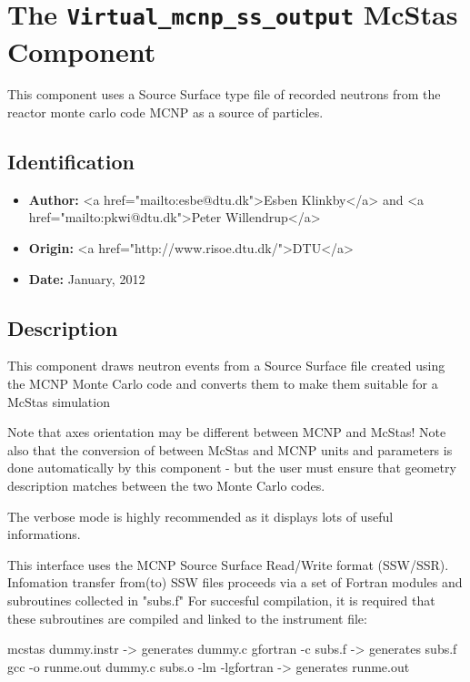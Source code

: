 \section{The \texttt{Virtual\_mcnp\_ss\_output} McStas Component}
This component uses a Source Surface type file of recorded neutrons from the
reactor monte carlo code MCNP as a source of particles.

\subsection*{Identification}
\begin{itemize}
  \item \textbf{Author:} \textless{}a href="mailto:esbe@dtu.dk"\textgreater{}Esben Klinkby\textless{}/a\textgreater{} and \textless{}a href="mailto:pkwi@dtu.dk"\textgreater{}Peter Willendrup\textless{}/a\textgreater{}
  \item \textbf{Origin:} \textless{}a href="http://www.risoe.dtu.dk/"\textgreater{}DTU\textless{}/a\textgreater{}
  \item \textbf{Date:} January, 2012
\end{itemize}

\subsection*{Description}
This component draws neutron events from a Source Surface file created using the MCNP Monte Carlo code and converts them to make them suitable for a McStas simulation

Note that axes orientation may be different between MCNP and McStas! Note also that the conversion of between McStas and MCNP units and parameters is done automatically by this component - but the user must ensure that geometry description matches between the two Monte Carlo codes.

The verbose mode is highly recommended as it displays lots of useful informations.

This interface uses the MCNP Source Surface Read/Write format (SSW/SSR). Infomation transfer from(to) SSW files proceeds via a set of Fortran modules and subroutines collected in "subs.f" For succesful compilation, it is required that these subroutines are compiled and linked to the instrument file:

mcstas dummy.instr -\textgreater{} generates dummy.c gfortran -c subs.f -\textgreater{} generates subs.f gcc -o runme.out dummy.c subs.o -lm -lgfortran -\textgreater{} generates runme.out

